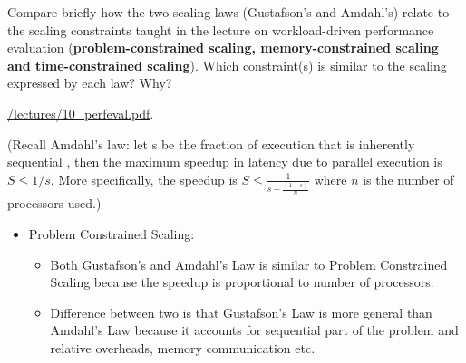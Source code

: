 \documentclass[11pt]{article}
\newcommand{\cref}[2]{\href{#1}{\color{blue}#2}}
\newenvironment{answer}{\begin{minipage}[c][1.5in]{\textwidth}}{\end{minipage}}
\begin{document}
Compare briefly how the two scaling laws (Gustafson's and Amdahl's) relate to the scaling constraints taught in the lecture on workload-driven performance evaluation (\textbf{problem-constrained scaling, memory-constrained scaling and time-constrained scaling}).  Which constraint(s) is similar to the
scaling expressed by each law?  Why?
\begin{center}
\cref{\actualcoursehome/lectures/10_perfeval.pdf}{\visiblecoursehome/lectures/10\_perfeval.pdf}.
\end{center}

(Recall Amdahl's law: let s be the fraction of execution that is inherently sequential , then the maximum speedup in latency due to parallel execution is $S \leq 1/s$. More specifically, the speedup is $S \leq \frac{1}{s + \frac{(1-s)}{n}}$ where $n$ is the number of processors used.)

\begin{answer}
\begin{itemize} %
\item Problem Constrained Scaling: 
\begin{itemize}
\item Both Gustafson's and Amdahl's Law is similar to Problem Constrained Scaling because the speedup is proportional to number of processors.
\item Difference between two is that Gustafson's Law is more general than Amdahl's Law because it accounts for sequential part of the problem and
relative overheads, memory communication etc.
\end{itemize}
\end{itemize}

\end{answer}
\newpage 
\end{document}
